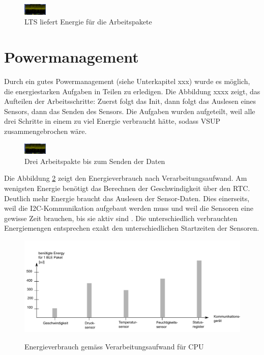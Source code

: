 \begin{figure}[ht]
    \includegraphics[width=0.1\textwidth]{4Resultate/imag/SpannungVCC.png} 
    \caption{LTS liefert Energie für die Arbeitspakete}
\end{figure}


\section{Powermanagement}

Durch ein gutes Powermanagement (siehe Unterkapitel xxx) wurde es möglich, die energiestarken Aufgaben in Teilen zu erledigen. Die Abbildung xxxx zeigt, das Aufteilen der Arbeitsschritte: Zuerst folgt das Init, dann folgt das Auslesen eines Sensors, dann das Senden des Sensors. Die Aufgaben wurden aufgeteilt, weil alle drei Schritte in einem zu viel Energie verbraucht hätte, sodass VSUP zusammengebrochen wäre.

\begin{figure}[ht]
    \includegraphics[width=0.1\textwidth]{4Resultate/imag/SpannungVCC.png} 
    \caption{Drei Arbeitspakte bis zum Senden der Daten }
    \label{blub}
\end{figure}


Die Abbildung \ref{resultat_E_Verbrauch_Verarbeitungsaufwand} zeigt den Energieverbrauch nach Verarbeitungsaufwand. Am wenigsten Energie benötigt das Berechnen der Geschwindigkeit über den RTC. Deutlich mehr Energie braucht das Auslesen der Sensor-Daten. Dies einerseits, weil die I2C-Kommunikation aufgebaut werden muss und weil die Sensoren eine gewisse Zeit brauchen, bis sie aktiv sind . Die unterschiedlich verbrauchten Energiemengen entsprechen exakt den unterschiedlichen Startzeiten der Sensoren. 

\begin{figure}[ht]
\includegraphics[width=1\textwidth]{4Resultate/imag/EnergyVerbrauchNachKommunikation.png} \label{resultat_E_Verbrauch_Verarbeitungsaufwand} 
\caption{Energieverbrauch gemäss Verarbeitungsaufwand für CPU}
\end{figure}

